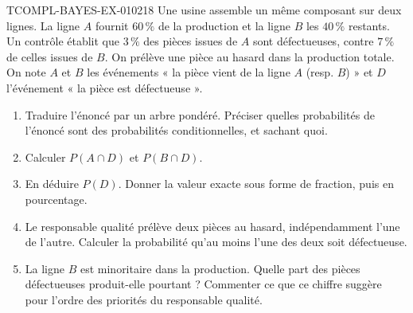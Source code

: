 \begin{exercice}{TCOMPL-BAYES-EX-010}{2}{18}
Une usine assemble un même composant sur deux lignes. La ligne $A$ fournit
$60\,\%$ de la production et la ligne $B$ les $40\,\%$ restants. Un contrôle
établit que $3\,\%$ des pièces issues de $A$ sont défectueuses, contre $7\,\%$
de celles issues de $B$. On prélève une pièce au hasard dans la production
totale. On note $A$ et $B$ les événements « la pièce vient de la ligne $A$ (resp.
$B$) » et $D$ l'événement « la pièce est défectueuse ».
\begin{enumerate}
  \item Traduire l'énoncé par un arbre pondéré. Préciser quelles probabilités de
    l'énoncé sont des probabilités conditionnelles, et sachant quoi.
  \item Calculer $P(A\cap D)$ et $P(B\cap D)$.
  \item En déduire $P(D)$. Donner la valeur exacte sous forme de fraction, puis
    en pourcentage.
  \item Le responsable qualité prélève deux pièces au hasard, indépendamment
    l'une de l'autre. Calculer la probabilité qu'au moins l'une des deux soit
    défectueuse.
  \item La ligne $B$ est minoritaire dans la production. Quelle part des pièces
    défectueuses produit-elle pourtant ? Commenter ce que ce chiffre suggère
    pour l'ordre des priorités du responsable qualité.
\end{enumerate}
\end{exercice}
